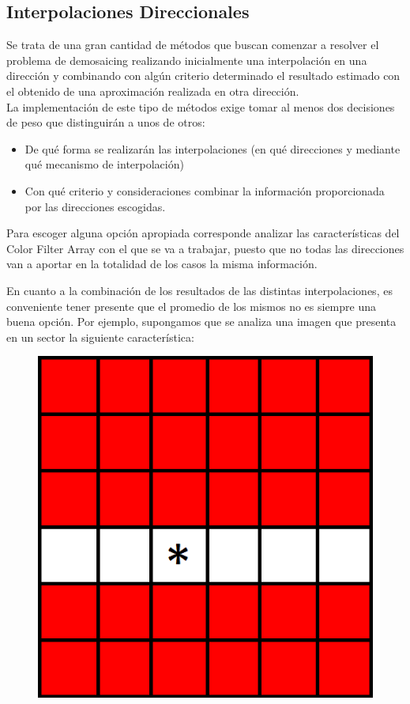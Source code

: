 \documentclass[a4paper]{article}
\begin{document}
\subsection{Interpolaciones Direccionales}
Se trata de una gran cantidad de métodos que buscan comenzar a resolver el problema de demosaicing realizando inicialmente una interpolación en una dirección y combinando con algún criterio determinado el resultado estimado con el obtenido de una aproximación realizada en otra dirección.\\

La implementación de este tipo de métodos exige tomar al menos dos decisiones de peso que distinguirán a unos de otros:\\

\begin{itemize}
    \item De qué forma se realizarán las interpolaciones (en qué direcciones y mediante qué mecanismo de interpolación)
    \item Con qué criterio y consideraciones combinar la información proporcionada por las direcciones escogidas.
\end{itemize}

Para escoger alguna opción apropiada corresponde analizar las características del Color Filter Array con el que se va a trabajar, puesto que no todas las direcciones van a aportar en la totalidad de los casos la misma información.

En cuanto a la combinación de los resultados de las distintas interpolaciones, es conveniente tener presente que el promedio de los mismos no es siempre una buena opción. Por ejemplo, supongamos que se analiza una imagen que presenta en un sector la siguiente característica:

\begin{figure}[h!]
	\caption{}
	\begin{center}
	\includegraphics[scale=0.26]{imagenes/direccional}
	\label{direccional}
  \end{center}
\end{figure}
\end{document}
